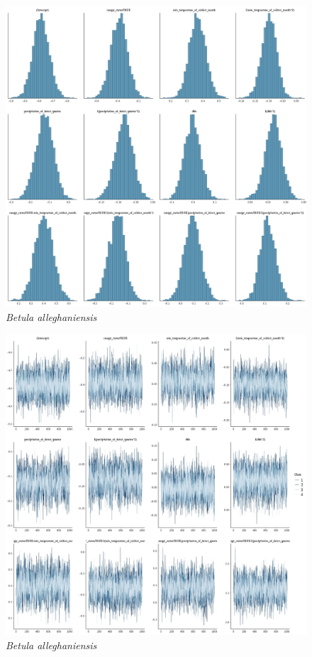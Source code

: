 \documentclass[letterpaper, 12pt]{article}
\begin{document}
\begin{figure}
	\centering
	\includegraphics[scale=0.4]{./19481-BET-ALL_hist}
	\caption{\textit{Betula alleghaniensis}}
\end{figure}

\begin{figure}
	\centering
	\includegraphics[scale=0.4]{./19481-BET-ALL_traces}
	\caption{\textit{Betula alleghaniensis}}
\end{figure}
\end{document}
